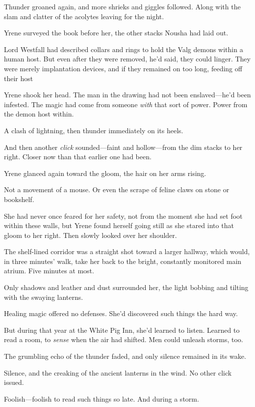 Thunder groaned again, and more shrieks and giggles followed.
Along with the slam and clatter of the acolytes leaving for the night.

Yrene surveyed the book before her, the other stacks Nousha had laid out.

Lord Westfall had described collars and rings to hold the Valg demons within a human host.
But even after they were removed, he'd said, they could linger.
They were merely implantation devices, and if they remained on too long, feeding off their host 

Yrene shook her head.
The man in the drawing had not been enslaved---he'd been infested.
The magic had come from someone \emph{with} that sort of power.
Power from the demon host within.

A clash of lightning, then thunder immediately on its heels.

And then another \emph{click} sounded---faint and hollow---from the dim stacks to her right.
Closer now than that earlier one had been.

Yrene glanced again toward the gloom, the hair on her arms rising.

Not a movement of a mouse.
Or even the scrape of feline claws on stone or bookshelf.

She had never once feared for her safety, not from the moment she had set foot within these walls, but Yrene found herself going still as she stared into that gloom to her right.
Then slowly looked over her shoulder.

The shelf-lined corridor was a straight shot toward a larger hallway, which would, in three minutes' walk, take her back to the bright, constantly monitored main atrium.
Five minutes at most.

Only shadows and leather and dust surrounded her, the light bobbing and tilting with the swaying lanterns.

Healing magic offered no defenses.
She'd discovered such things the hard way.

But during that year at the White Pig Inn, she'd learned to listen.
Learned to read a room, to \emph{sense} when the air had shifted.
Men could unleash storms, too.

The grumbling echo of the thunder faded, and only silence remained in its wake.

Silence, and the creaking of the ancient lanterns in the wind.
No other click issued.

Foolish---foolish to read such things so late.
And during a storm.

